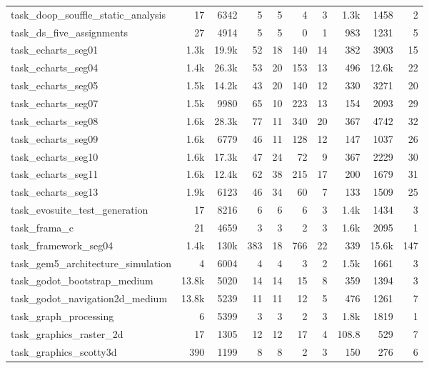 \begin{table}[!htbp]
{\begin{tabular}{@{}lrr|r|rrr|rrr@{}}
task\_doop\_souffle\_static\_analysis & 17 & 6342 & 5 & 5 & 4 & 3 & 1.3k & 1458 & 2 \\
task\_ds\_five\_assignments & 27 & 4914 & 5 & 5 & 0 & 1 & 983 & 1231 & 5 \\
task\_echarts\_seg01 & 1.3k & 19.9k & 52 & 18 & 140 & 14 & 382 & 3903 & 15 \\
task\_echarts\_seg04 & 1.4k & 26.3k & 53 & 20 & 153 & 13 & 496 & 12.6k & 22 \\
task\_echarts\_seg05 & 1.5k & 14.2k & 43 & 20 & 140 & 12 & 330 & 3271 & 20 \\
task\_echarts\_seg07 & 1.5k & 9980 & 65 & 10 & 223 & 13 & 154 & 2093 & 29 \\
task\_echarts\_seg08 & 1.6k & 28.3k & 77 & 11 & 340 & 20 & 367 & 4742 & 32 \\
task\_echarts\_seg09 & 1.6k & 6779 & 46 & 11 & 128 & 12 & 147 & 1037 & 26 \\
task\_echarts\_seg10 & 1.6k & 17.3k & 47 & 24 & 72 & 9 & 367 & 2229 & 30 \\
task\_echarts\_seg11 & 1.6k & 12.4k & 62 & 38 & 215 & 17 & 200 & 1679 & 31 \\
task\_echarts\_seg13 & 1.9k & 6123 & 46 & 34 & 60 & 7 & 133 & 1509 & 25 \\
task\_evosuite\_test\_generation & 17 & 8216 & 6 & 6 & 6 & 3 & 1.4k & 1434 & 3 \\
task\_frama\_c & 21 & 4659 & 3 & 3 & 2 & 3 & 1.6k & 2095 & 1 \\
task\_framework\_seg04 & 1.4k & 130k & 383 & 18 & 766 & 22 & 339 & 15.6k & 147 \\
task\_gem5\_architecture\_simulation & 4 & 6004 & 4 & 4 & 3 & 2 & 1.5k & 1661 & 3 \\
task\_godot\_bootstrap\_medium & 13.8k & 5020 & 14 & 14 & 15 & 8 & 359 & 1394 & 3 \\
task\_godot\_navigation2d\_medium & 13.8k & 5239 & 11 & 11 & 12 & 5 & 476 & 1261 & 7 \\
task\_graph\_processing & 6 & 5399 & 3 & 3 & 2 & 3 & 1.8k & 1819 & 1 \\
task\_graphics\_raster\_2d & 17 & 1305 & 12 & 12 & 17 & 4 & 108.8 & 529 & 7 \\
task\_graphics\_scotty3d & 390 & 1199 & 8 & 8 & 2 & 3 & 150 & 276 & 6 \\
\bottomrule
\end{tabular}
}
\end{table}

